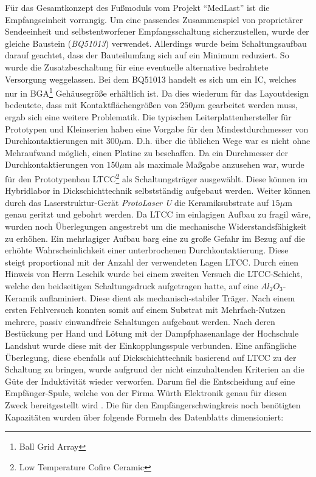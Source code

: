 \documentclass[12pt]{scrreprt} %
\begin{document}
Für das Gesamtkonzept des Fußmoduls vom Projekt "`MedLast"' ist die Empfangseinheit vorrangig. Um eine passendes Zusammenspiel von proprietärer Sendeeinheit und selbstentworfener Empfangsschaltung sicherzustellen, wurde der gleiche Baustein (\textit{BQ51013}) verwendet. Allerdings wurde beim Schaltungsaufbau darauf geachtet, dass der Bauteilumfang sich auf ein Minimum reduziert. So wurde die Zusatzbeschaltung für eine eventuelle alternative bedrahtete Versorgung weggelassen. Bei dem BQ51013 handelt es sich um ein IC, welches nur in BGA\footnote{Ball Grid Array} Gehäusegröße erhältlich ist. Da dies wiederum für das Layoutdesign bedeutete, dass mit Kontaktflächengrößen von $250\mu$m gearbeitet werden muss, ergab sich eine weitere Problematik. Die typischen Leiterplattenhersteller für Prototypen und Kleinserien haben eine Vorgabe für den Mindestdurchmesser von Durchkontaktierungen mit $300\mu$m. D.h. über die üblichen Wege war es nicht ohne Mehraufwand möglich, einen Platine zu beschaffen. Da ein Durchmesser der Durchkontaktierungen von $150\mu$m als maximale Maßgabe anzusehen war, wurde für den Prototypenbau LTCC\footnote{Low Temperature Cofire Ceramic} als Schaltungsträger ausgewählt. Diese können im Hybridlabor in Dickschichttechnik selbstständig aufgebaut werden. Weiter können durch das Laserstruktur-Gerät \textit{ProtoLaser U} die Keramiksubstrate auf $15\mu$m genau geritzt und gebohrt werden.  Da LTCC im einlagigen Aufbau zu fragil wäre, wurden noch Überlegungen angestrebt um die mechanische Widerstandsfähigkeit zu erhöhen. Ein mehrlagiger Aufbau barg eine zu große Gefahr im Bezug auf die erhöhte Wahrscheinlichkeit einer unterbrochenen Durchkontaktierung. Diese steigt proportional mit der Anzahl der verwendeten Lagen LTCC. Durch einen Hinweis von Herrn Leschik wurde bei einem zweiten Versuch die LTCC-Schicht, welche den beidseitigen Schaltungsdruck aufgetragen hatte, auf eine $Al_2O_3$-Keramik auflaminiert. Diese dient als mechanisch-stabiler Träger. Nach einem ersten Fehlversuch konnten somit auf einem Substrat mit Mehrfach-Nutzen mehrere, passiv einwandfreie Schaltungen aufgebaut werden. Nach deren Bestückung per Hand und Lötung mit der Dampfphasenanlage der Hochschule Landshut wurde diese mit der Einkopplungsspule verbunden. Eine anfängliche Überlegung, diese ebenfalls auf Dickschichttechnik basierend auf LTCC zu der Schaltung zu bringen, wurde aufgrund der nicht einzuhaltenden Kriterien an die Güte der Induktivität wieder verworfen. Darum fiel die Entscheidung auf eine Empfänger-Spule, welche von der Firma Würth Elektronik genau für diesen Zweck bereitgestellt wird \citep{Spule}. Die für den Empfängerschwingkreis noch benötigten Kapazitäten wurden über folgende Formeln des Datenblatts \citep{BQ51013} dimensioniert: 
\end{document}
